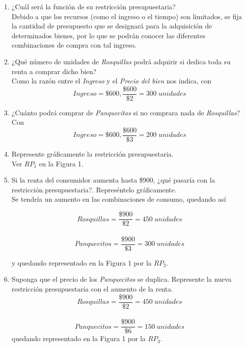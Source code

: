 \documentclass[a4paper,12pt]{article}
\begin{document}
\begin{enumerate}[label=\alph*)]

\item ¿Cuál será la función de su restricción presupuestaria?\\Debido a que los recursos (como el ingreso o el tiempo) son limitados, se fija la cantidad de presupuesto que se designará para la adquisición de determinados bienes, por lo que se podrán conocer las diferentes combinaciones de compra con tal ingreso.\par

\item ¿Qué número de unidades de \textit{Rosquillas} podrá adquirir si dedica toda su renta a comprar dicho bien?\\Como la razón entre el \emph{Ingreso} y el \emph{Precio del bien} nos indica, con\\ \[Ingreso = \$600, \frac{\$600}{\$2} = 300\;unidades\]\par

\item ¿Cuánto podrá comprar de \textit{Panquecitos} si no comprara nada de \textit{Rosquillas}?\\Con \[Ingreso = \$600, \frac{\$600}{\$3} = 200\;unidades\]\par

\item Represente gráficamente la restricción presupuestaria. \\Ver $RP_1$ en la Figura 1.\par

\item Si la renta del consumidor aumenta hasta \$900, ¿qué pasaría con la restricción presupuestaria?. Represéntelo gráficamente.\\ Se tendría un aumento en las combinaciones de consumo, quedando así

	\[Rosquillas = \frac{\$900}{\$2} = 450\;unidades\]
\\
	\[Panquecitos = \frac{\$900}{\$3} = 300\;unidades\]

 y quedando representado en la Figura 1 por la $RP_2$.\par

\item Suponga que el precio de los \textit{Panquecitos} se duplica. Represente la nueva restricción presupuestaria con el aumento de la renta.\\
	\[Rosquillas = \frac{\$900}{\$2} = 450\;unidades\]
\\
	\[Panquecitos = \frac{\$900}{\$6} = 150\;unidades\]
 quedando representado en la Figura 1 por la $RP_3$.\par

\end{enumerate}
\end{document}
